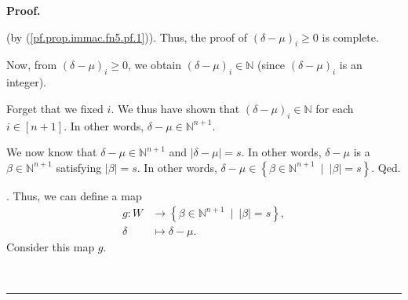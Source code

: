 \documentclass[numbers=enddot,12pt,final,onecolumn,notitlepage,english]{scrartcl}%
\theoremstyle{definition}
\newenvironment{proof}[1][Proof]{\noindent\textbf{#1.} }{\ \rule{0.5em}{0.5em}}
\newenvironment{verlong}{}{}
\begin{document}
\begin{proof}
\begin{verlong}
{\[\]
(by (\ref{pf.prop.immac.fn5.pf.1})). Thus, the proof of $\left(  \delta
-\mu\right)  _{i}\geq0$ is complete.
\par
Now, from $\left(  \delta-\mu\right)  _{i}\geq0$, we obtain $\left(
\delta-\mu\right)  _{i}\in\mathbb{N}$ (since $\left(  \delta-\mu\right)  _{i}$
is an integer).
\par
Forget that we fixed $i$. We thus have shown that $\left(  \delta-\mu\right)
_{i}\in\mathbb{N}$ for each $i\in\left[  n+1\right]  $. In other words,
$\delta-\mu\in\mathbb{N}^{n+1}$.
\par
We now know that $\delta-\mu\in\mathbb{N}^{n+1}$ and $\left\vert \delta
-\mu\right\vert =s$. In other words, $\delta-\mu$ is a $\beta\in
\mathbb{N}^{n+1}$ satisfying $\left\vert \beta\right\vert =s$. In other words,
$\delta-\mu\in\left\{  \beta\in\mathbb{N}^{n+1}\ \mid\ \left\vert
\beta\right\vert =s\right\}  $. Qed.}. Thus, we can define a map%
\begin{align*}
g:W  &  \rightarrow\left\{  \beta\in\mathbb{N}^{n+1}\ \mid\ \left\vert
\beta\right\vert =s\right\}  ,\\
\delta &  \mapsto\delta-\mu.
\end{align*}
Consider this map $g$.


\end{verlong}
\end{proof}
\end{document}
